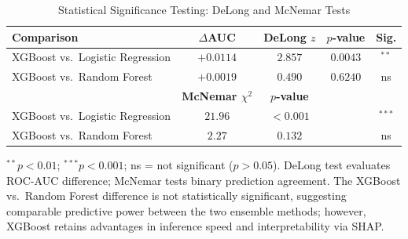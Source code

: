 \begin{table}[!t]
  \renewcommand{\arraystretch}{1.25}
  \caption{Statistical Significance Testing: DeLong and McNemar Tests}
  \label{tab:significance}
  \centering
  \begin{tabular}{lcccc}
    \hline
    \textbf{Comparison} & \textbf{$\Delta$AUC} & \textbf{DeLong $z$} & \textbf{$p$-value} & \textbf{Sig.} \\
    \hline
    XGBoost vs.\ Logistic Regression & $+0.0114$ & $2.857$ & $0.0043$ & $^{**}$ \\
    XGBoost vs.\ Random Forest       & $+0.0019$ & $0.490$ & $0.6240$ & ns \\
    \hline
    & \textbf{McNemar $\chi^2$} & \textbf{$p$-value} & & \\
    \hline
    XGBoost vs.\ Logistic Regression & $21.96$ & $< 0.001$ & & $^{***}$ \\
    XGBoost vs.\ Random Forest       & $2.27$  & $0.132$   & & ns \\
    \hline
  \end{tabular}
  \vspace{1mm}
  \begin{flushleft}
    \small
    $^{**}p < 0.01$; $^{***}p < 0.001$; ns = not significant ($p > 0.05$).
    DeLong test evaluates ROC-AUC difference; McNemar tests binary prediction agreement.
    The XGBoost vs.\ Random Forest difference is not statistically significant,
    suggesting comparable predictive power between the two ensemble methods;
    however, XGBoost retains advantages in inference speed and interpretability
    via SHAP.
  \end{flushleft}
\end{table}



